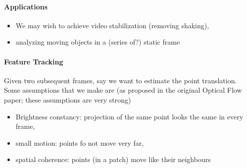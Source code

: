 \documentclass[11pt]{article}
\begin{document}
\paragraph{Applications}
\begin{itemize}
	\item We may wish to achieve video stabilization (removing shaking), 
	\item analyzing moving objects in a (series of?) static frame
\end{itemize}

\paragraph{Feature Tracking}
Given two subsequent frames, say we want to estimate the point translation. Some assumptions that we make are (as proposed in the original Optical Flow paper; these assumptions are very strong)
\begin{itemize}
	\item Brightness constancy: projection of the same point looks the same in every frame, 
	\item small motion: points fo not move very far,
	\item spatial coherence: points (in a patch) move like their neighbours
\end{itemize}
\end{document}

